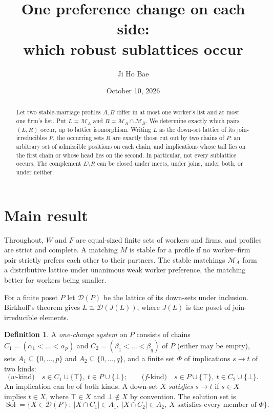 \documentclass[11pt]{amsart}
\title{One preference change on each side:\\ which robust sublattices occur}
\author{Ji Ho Bae}
\date{October 10, 2026}
\theoremstyle{definition}
\newtheorem{definition}[theorem]{Definition}
\theoremstyle{remark}
\newcommand{\D}{\mathcal D}
\newcommand{\Sol}{\operatorname{Sol}}
\begin{document}
\begin{abstract}
Let two stable-marriage profiles $A,B$ differ in at most one worker's list and at most one firm's list. Put $L=\mathcal M_A$ and $R=\mathcal M_A\cap\mathcal M_B$. We determine exactly which pairs $(L,R)$ occur, up to lattice isomorphism. Writing $L$ as the down-set lattice of its join-irreducibles $P$, the occurring sets $R$ are exactly those cut out by two chains of $P$: an arbitrary set of admissible positions on each chain, and implications whose tail lies on the first chain or whose head lies on the second. In particular, not every sublattice occurs. The complement $L\setminus R$ can be closed under meets, under joins, under both, or under neither.
\end{abstract}

\maketitle

\section{Main result}

Throughout, $W$ and $F$ are equal-sized finite sets of workers and firms, and profiles are strict and complete. A matching $M$ is stable for a profile if no worker--firm pair strictly prefers each other to their partners. The stable matchings $\mathcal M_A$ form a distributive lattice under unanimous weak worker preference, the matching better for workers being smaller.

For a finite poset $P$ let $\D(P)$ be the lattice of its down-sets under inclusion. Birkhoff's theorem gives $L\cong\D(J(L))$, where $J(L)$ is the poset of join-irreducible elements.

\begin{definition}\label{def:system}
A \emph{one-change system} on $P$ consists of chains $C_1=(\alpha_1<\dots<\alpha_p)$ and $C_2=(\beta_1<\dots<\beta_q)$ of $P$ (either may be empty), sets $A_1\subseteq\{0,\dots,p\}$ and $A_2\subseteq\{0,\dots,q\}$, and a finite set $\Phi$ of implications $s\to t$ of two kinds:
\[
 \text{($w$-kind)}\quad s\in C_1\cup\{\top\},\ t\in P\cup\{\bot\};\qquad
 \text{($f$-kind)}\quad s\in P\cup\{\top\},\ t\in C_2\cup\{\bot\}.
\]
An implication can be of both kinds. A down-set $X$ \emph{satisfies} $s\to t$ if $s\in X$ implies $t\in X$, where $\top\in X$ and $\bot\notin X$ by convention. The solution set is
\[
 \Sol=\{X\in\D(P):\ |X\cap C_1|\in A_1,\ |X\cap C_2|\in A_2,\ X\text{ satisfies every member of }\Phi\}.
\]
\end{definition}
\end{document}

